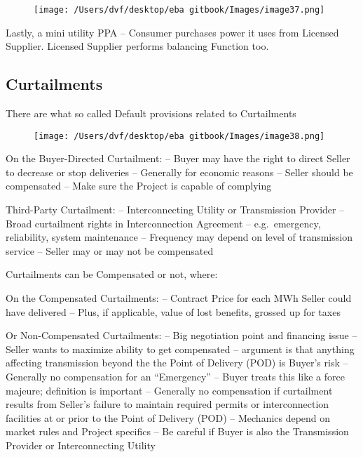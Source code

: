 \documentclass[]{book}
\theoremstyle{definition}
\theoremstyle{definition}
\theoremstyle{definition}
\theoremstyle{remark}
\begin{document}
\begin{figure}[htbp]
\centering
\texttt{[image: /Users/dvf/desktop/eba gitbook/Images/image37.png]}
\caption{}
\end{figure}

Lastly, a mini utility PPA -- Consumer purchases power it uses from
Licensed Supplier. Licensed Supplier performs balancing Function too.

\subsection{Curtailments}\label{curtailments}

There are what so called Default provisions related to Curtailments

\begin{figure}[htbp]
\centering
\texttt{[image: /Users/dvf/desktop/eba gitbook/Images/image38.png]}
\caption{}
\end{figure}

On the Buyer-Directed Curtailment: -- Buyer may have the right to direct
Seller to decrease or stop deliveries -- Generally for economic reasons
-- Seller should be compensated -- Make sure the Project is capable of
complying

Third-Party Curtailment: -- Interconnecting Utility or Transmission
Provider -- Broad curtailment rights in Interconnection Agreement --
e.g.~emergency, reliability, system maintenance -- Frequency may depend
on level of transmission service -- Seller may or may not be compensated

Curtailments can be Compensated or not, where:

On the Compensated Curtailments: -- Contract Price for each MWh Seller
could have delivered -- Plus, if applicable, value of lost benefits,
grossed up for taxes

Or Non-Compensated Curtailments: -- Big negotiation point and financing
issue -- Seller wants to maximize ability to get compensated -- argument
is that anything affecting transmission beyond the the Point of Delivery
(POD) is Buyer's risk -- Generally no compensation for an ``Emergency''
-- Buyer treats this like a force majeure; definition is important --
Generally no compensation if curtailment results from Seller's failure
to maintain required permits or interconnection facilities at or prior
to the Point of Delivery (POD) -- Mechanics depend on market rules and
Project specifics -- Be careful if Buyer is also the Transmission
Provider or Interconnecting Utility
\end{document}
